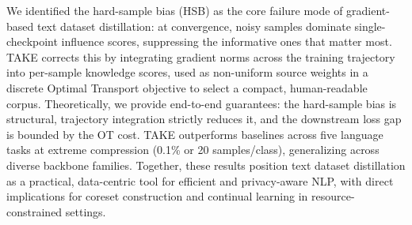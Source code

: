 We identified the hard-sample bias (HSB) as the core failure mode of gradient-based text dataset distillation: at convergence, noisy samples dominate single-checkpoint influence scores, suppressing the informative ones that matter most.
TAKE corrects this by integrating gradient norms across the training trajectory into per-sample knowledge scores, used as non-uniform source weights in a discrete Optimal Transport objective to select a compact, human-readable corpus.
Theoretically, we provide end-to-end guarantees: the hard-sample bias is structural, trajectory integration strictly reduces it, and the downstream loss gap is bounded by the OT cost.
TAKE outperforms baselines across five language tasks at extreme compression (0.1\% or 20 samples/class), generalizing across diverse backbone families.
Together, these results position text dataset distillation as a practical, data-centric tool for efficient and privacy-aware NLP, with direct implications for coreset construction and continual learning in resource-constrained settings.
